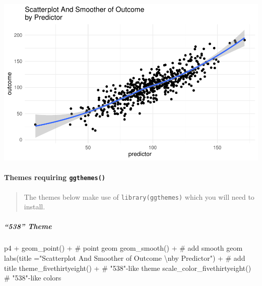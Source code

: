 \documentclass[12pt,]{article}
\newenvironment{Shaded}{}{}
\newcommand{\CharTok}[1]{\textcolor[rgb]{0.00,0.50,0.50}{#1}}
\newcommand{\CommentTok}[1]{\textcolor[rgb]{0.00,0.50,0.00}{#1}}
\newcommand{\DataTypeTok}[1]{#1}
\newcommand{\KeywordTok}[1]{\textcolor[rgb]{0.00,0.00,1.00}{#1}}
\newcommand{\NormalTok}[1]{#1}
\newcommand{\OperatorTok}[1]{#1}
\newcommand{\StringTok}[1]{\textcolor[rgb]{0.00,0.50,0.50}{#1}}
\let\oldparagraph\paragraph
\renewcommand{\paragraph}[1]{\oldparagraph{#1}\mbox{}}
\let\oldsubparagraph\subparagraph
\renewcommand{\subparagraph}[1]{\oldsubparagraph{#1}\mbox{}}
\begin{document}
\includegraphics{introduction-to-ggplot2_files/figure-latex/unnamed-chunk-25-1.pdf}

\hypertarget{themes-requiring-ggthemes}{%
\paragraph{\texorpdfstring{Themes requiring
\texttt{ggthemes()}}{Themes requiring ggthemes()}}\label{themes-requiring-ggthemes}}

\begin{quote}
The themes below make use of \texttt{library(ggthemes)} which you will
need to install.
\end{quote}

\hypertarget{theme}{%
\subparagraph{``538'' Theme}\label{theme}}

\begin{Shaded}
\begin{Highlighting}[]
\NormalTok{p4 }\OperatorTok{+}\StringTok{ }
\StringTok{  }\KeywordTok{geom_point}\NormalTok{() }\OperatorTok{+}\StringTok{ }\CommentTok{# point geom}
\StringTok{  }\KeywordTok{geom_smooth}\NormalTok{() }\OperatorTok{+}\StringTok{ }\CommentTok{# add smooth geom}
\StringTok{  }\KeywordTok{labs}\NormalTok{(}\DataTypeTok{title =}\StringTok{"Scatterplot And Smoother of Outcome }\CharTok{\textbackslash{}n}\StringTok{by Predictor"}\NormalTok{) }\OperatorTok{+}\StringTok{ }\CommentTok{# add title}
\StringTok{  }\KeywordTok{theme_fivethirtyeight}\NormalTok{() }\OperatorTok{+}\StringTok{ }\CommentTok{# "538"-like theme}
\StringTok{  }\KeywordTok{scale_color_fivethirtyeight}\NormalTok{() }\CommentTok{# "538"-like colors}
\end{Highlighting}
\end{Shaded}
\end{document}

